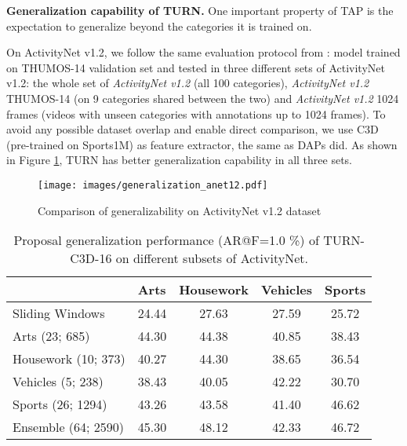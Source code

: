 \documentclass[10pt,twocolumn,letterpaper]{article}
\begin{document}
\textbf{Generalization capability of TURN.}
One important property of TAP is the expectation to generalize beyond the categories it is trained on. 

On ActivityNet v1.2, we follow the same evaluation protocol from \cite{escorcia2016daps}: model trained on THUMOS-14 validation set and tested in three different sets of ActivityNet v1.2: the whole set of \textit{ActivityNet v1.2} (all 100 categories), \textit{ActivityNet v1.2}  THUMOS-14 (on 9 categories shared between the two) and \textit{ActivityNet v1.2}  1024 frames (videos with unseen categories with annotations up to 1024 frames). To avoid any possible dataset overlap and enable direct comparison, we use C3D (pre-trained on Sports1M) as feature extractor, the same as DAPs did. As shown in Figure \ref{fig:generalization}, TURN has better generalization capability in all three sets.
\begin{figure}[]

  \centering
    \texttt{[image: images/generalization\_anet12.pdf]}
    \caption{Comparison of generalizability on ActivityNet v1.2 dataset}
      \label{fig:generalization}
\end{figure}



\begin{table}[h]\footnotesize
\centering
\caption{Proposal generalization performance (AR@F=1.0 \%) of TURN-C3D-16 on different subsets of ActivityNet.}
\label{tbl:generalization}
\begin{tabular}{l|cccc}
\hline
\multicolumn{1}{l|}{} & \multicolumn{1}{l}{Arts} & \multicolumn{1}{l}{Housework} & \multicolumn{1}{l}{Vehicles} & Sports \\ \hline
Sliding Windows   &24.44    &27.63    &27.59    &25.72 \\ \hline
Arts (23; 685)                  & 44.30                    & 44.38                         & 40.85                         & 38.43  \\
Housework (10; 373)             & 40.27                    & 44.30                         & 38.65                        & 36.54  \\
Vehicles (5; 238)              & 38.43                    & 40.05                         & 42.22                        & 30.70  \\
Sports (26; 1294)                & 43.26                    & 43.58                         & 41.40                        & 46.62  \\ 
Ensemble (64; 2590)        &45.30      &48.12     &42.33      &46.72 \\ \hline 
\end{tabular}
\end{table}
\end{document}
